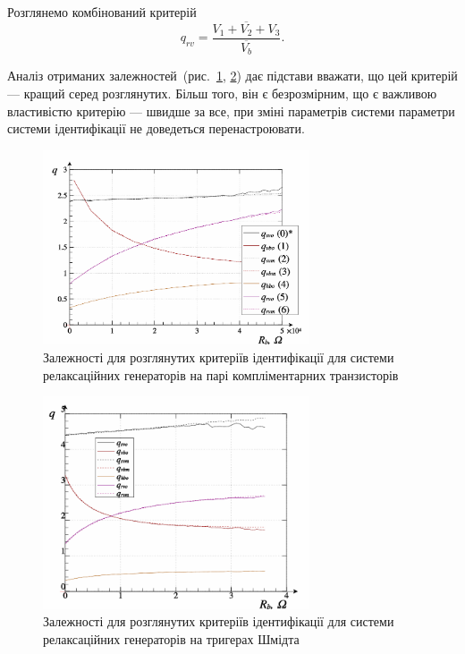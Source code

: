 Розглянемо комбінований критерій
%
\begin{equation}
  q_{rv} = \frac{\overline{V_1+V_2+V_3}}{\overline{V_b}}.
  \label{atu:eq:q_rv_relax}
\end{equation}


Аналіз отриманих залежностей~(рис.~\ref{atu:f:relax3d_q}, \ref{atu:f:relax3ds_q})
дає підстави вважати, що цей критерій --- кращий серед
розглянутих. Більш того, він є безрозмірним, що є важливою
властивістю критерію --- швидше за все, при зміні параметрів
системи параметри системи ідентифікації не
доведеться перенастроювати.

\begin{figure}[htb!]
  \centerline{\includegraphics[width=0.7\textwidth]{p/relax3d_read_q-p_q1.png} }
  \caption{Залежності для розглянутих критеріїв ідентифікації для системи релаксаційних генераторів на парі компліментарних транзисторів}
  \label{atu:f:relax3d_q}
\end{figure}

\begin{figure}[htb!]
  \centerline{\includegraphics[width=0.7\textwidth]{p/relax3ds_read_q-p_q1.png} }
\caption{Залежності для розглянутих критеріїв ідентифікації для системи релаксаційних генераторів на тригерах Шмідта}
  \label{atu:f:relax3ds_q}
\end{figure}

